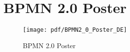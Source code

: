 \section{BPMN 2.0 Poster}
\begin {figure}[H]
 \centering
 \texttt{[image: pdf/BPMN2\_0\_Poster\_DE]}
 \caption{BPMN 2.0 Poster} \cite{BPMOffensiveBerlin.28.04.2014}
 \end {figure} 